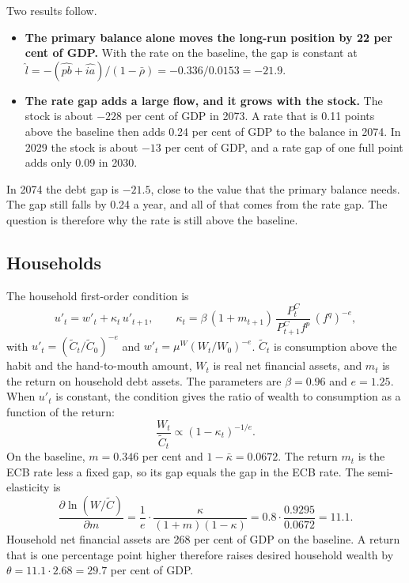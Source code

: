 \documentclass[11pt,a4paper]{article}
\begin{document}
Two results follow.
\begin{itemize}
\item \textbf{The primary balance alone moves the long-run position by 22 per cent of GDP.}
With the rate on the baseline, the gap is constant at $\hat{l} = -(\widehat{pb} + \widehat{ia})/(1-\bar{\rho}) = -0.336/0.0153 = -21.9$.
\item \textbf{The rate gap adds a large flow, and it grows with the stock.}
The stock is about $-228$ per cent of GDP in 2073. A rate that is 0.11 points above the baseline then adds 0.24 per cent of GDP to the balance in 2074. In 2029 the stock is about $-13$ per cent of GDP, and a rate gap of one full point adds only 0.09 in 2030.
\end{itemize}
In 2074 the debt gap is $-21.5$, close to the value that the primary balance needs. The gap still falls by 0.24 a year, and all of that comes from the rate gap.
The question is therefore why the rate is still above the baseline.

\subsection{Households}

The household first-order condition is
\begin{equation}
u'_t = w'_t + \kappa_t\, u'_{t+1} , \qquad
\kappa_t = \beta\, (1+m_{t+1})\, \frac{P^C_t}{P^C_{t+1} f^p}\, (f^q)^{-e} ,
\end{equation}
with $u'_t = (\tilde{C}_t/\tilde{C}_0)^{-e}$ and $w'_t = \mu^W (W_t/W_0)^{-e}$.
$\tilde{C}_t$ is consumption above the habit and the hand-to-mouth amount, $W_t$ is real net financial assets, and $m_t$ is the return on household debt assets.
The parameters are $\beta = 0.96$ and $e = 1.25$.
When $u'_t$ is constant, the condition gives the ratio of wealth to consumption as a function of the return:
\begin{equation}
\frac{W_t}{\tilde{C}_t} \propto (1 - \kappa_t)^{-1/e} .
\label{eq:wealth}
\end{equation}
On the baseline, $m = 0.346$ per cent and $1 - \bar{\kappa} = 0.0672$. The return $m_t$ is the ECB rate less a fixed gap, so its gap equals the gap in the ECB rate.
The semi-elasticity is
\[
\frac{\partial \ln (W/\tilde{C})}{\partial m} = \frac{1}{e} \cdot \frac{\kappa}{(1+m)(1-\kappa)} = 0.8 \cdot \frac{0.9295}{0.0672} = 11.1 .
\]
Household net financial assets are 268 per cent of GDP on the baseline. A return that is one percentage point higher therefore raises desired household wealth by $\theta = 11.1 \cdot 2.68 = 29.7$ per cent of GDP.
\end{document}
